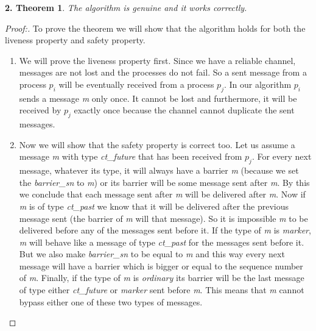 \documentclass[12pt]{article}
\theoremstyle{plain}
\begin{document}
\newtheorem*{th1}{2.  Theorem}
\begin{th1}
  The algorithm is genuine and it works correctly.
\end{th1}
\begin{proof}[Proof:]
  To prove the theorem we will show that the algorithm holds for both the
  liveness property and safety property.
  \begin{enumerate}
    \item We will prove the liveness property first. Since we have a reliable
      channel, messages are not lost and the processes do not fail. So a sent 
      message from a process $p_i$ will be eventually received  from a process 
      $p_j$. In our algorithm $p_i$ sends a message \emph{m} only once. It
      cannot be lost and furthermore, it will be received by $p_j$ exactly once
      because the channel cannot duplicate the sent messages.
    \item Now we will show that the safety property is correct too. Let us
      assume a message \emph{m} with type \emph{ct\_future} that has been
      received from $p_j$. For every next message, whatever its type, it will
      always have a barrier \emph{m} (because we set the \emph{barrier\_sn} to
      \emph{m}) or its barrier will be some message sent after \emph{m}. By this
      we conclude that each message sent after \emph{m} will be delivered after
      \emph{m}.
      Now if \emph{m} is of type \emph{ct\_past} we know that it will be
      delivered after the previous message sent (the barrier of \emph{m} will
      that message). So it is impossible \emph{m} to be delivered before any of
      the messages sent before it.
      If the type of \emph{m} is \emph{marker}, \emph{m} will behave like a
      message of type \emph{ct\_past} for the messages sent before it. But we
      also make \emph{barrier\_sn} to be equal to \emph{m} and this way every
      next message will have a barrier which is bigger or equal to the sequence
      number of \emph{m}.
      Finally, if the type of \emph{m} is \emph{ordinary} its barrier will be
      the last message of type either \emph{ct\_future} or \emph{marker} sent
      before \emph{m}. This means that \emph{m} cannot bypass either one of
      these two types of messages.
  \end{enumerate}
\end{proof}
\end{document}
